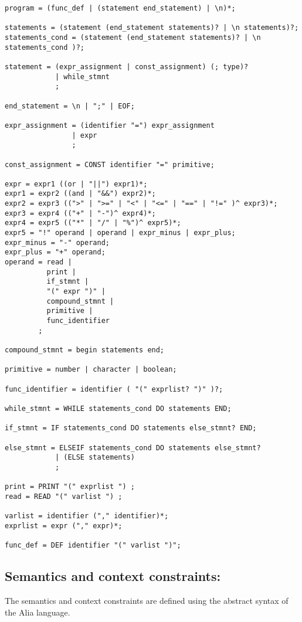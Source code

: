 \documentclass[paper=a4, fontsize=11pt]{article}
\numberwithin{equation}{section}		%
\numberwithin{figure}{section}			%
\numberwithin{table}{section}				%
\begin{document}
\begin{verbatim}
program = (func_def | (statement end_statement) | \n)*;

statements = (statement (end_statement statements)? | \n statements)?;
statements_cond = (statement (end_statement statements)? | \n statements_cond )?;

statement = (expr_assignment | const_assignment) (; type)?
			| while_stmnt 
			;

end_statement = \n | ";" | EOF;

expr_assignment = (identifier "=") expr_assignment
				| expr 
				;

const_assignment = CONST identifier "=" primitive;

expr = expr1 ((or | "||") expr1)*;
expr1 = expr2 ((and | "&&") expr2)*;
expr2 = expr3 ((">" | ">=" | "<" | "<=" | "==" | "!=" )^ expr3)*;
expr3 = expr4 (("+" | "-")^ expr4)*;
expr4 = expr5 (("*" | "/" | "%")^ expr5)*;
expr5 = "!" operand | operand | expr_minus | expr_plus;
expr_minus = "-" operand;
expr_plus = "+" operand;
operand = read |
	   	  print |
	   	  if_stmnt |
	   	  "(" expr ")" |
	   	  compound_stmnt |
	   	  primitive |
	   	  func_identifier
		;
		  
compound_stmnt = begin statements end;

primitive = number | character | boolean;

func_identifier = identifier ( "(" exprlist? ")" )?;

while_stmnt = WHILE statements_cond DO statements END;

if_stmnt = IF statements_cond DO statements else_stmnt? END;

else_stmnt = ELSEIF statements_cond DO statements else_stmnt?
			| (ELSE statements)
			;

print = PRINT "(" exprlist ") ;
read = READ "(" varlist ") ;

varlist = identifier ("," identifier)*;
exprlist = expr ("," expr)*;

func_def = DEF identifier "(" varlist ")";
\end{verbatim}


\subsection{Semantics and context constraints:}
The semantics and context constraints are defined using the abstract syntax of the Alia language.
\end{document}
